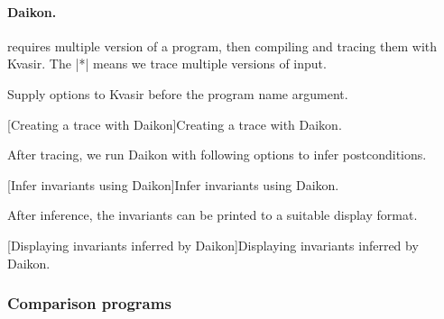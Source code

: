 \paragraph*{Daikon.}
 requires multiple version of a program, then compiling and tracing them with Kvasir.
The \pr|*| means we trace multiple versions of input.
\newline

Supply options to Kvasir before the program name argument.

\begin{center}
\begin{minipage}{\textwidth}
\captionsetup{type=lstlisting}
[Creating a trace with Daikon]{Creating a trace with Daikon.}
\label{lst:kvasir-bash}
\end{minipage}
\end{center}

After tracing, we run Daikon with following options to infer postconditions.

\begin{center}
\begin{minipage}{\textwidth}
\captionsetup{type=lstlisting}
[Infer invariants using Daikon]{Infer invariants using Daikon.}
\label{lst:daikon-bash}
\end{minipage}
\end{center}

After inference, the invariants can be printed to a suitable display format.

\begin{center}
\begin{minipage}{\textwidth}
\captionsetup{type=lstlisting}
[Displaying invariants inferred by Daikon]{Displaying invariants inferred by Daikon.}
\label{lst:print-bash}
\end{minipage}
\end{center}

\subsubsection{Comparison programs}
\label{subsec:comparison-programs}

